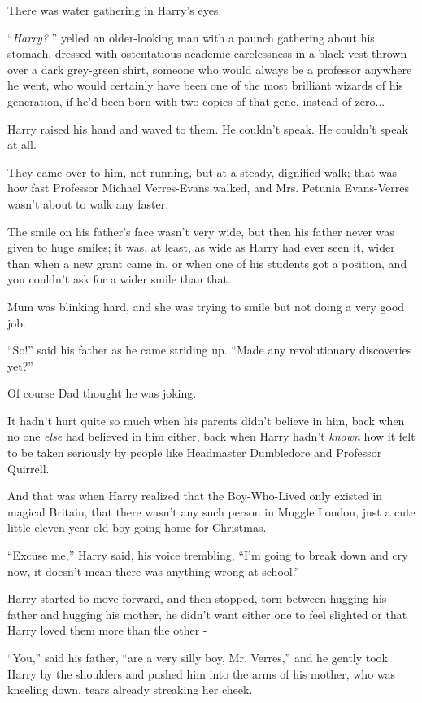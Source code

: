There was water gathering in Harry's eyes.

``\emph{Harry?} '' yelled an older-looking man with a paunch gathering
about his stomach, dressed with ostentatious academic carelessness in a
black vest thrown over a dark grey-green shirt, someone who would always
be a professor anywhere he went, who would certainly have been one of
the most brilliant wizards of his generation, if he'd been born with two
copies of that gene, instead of zero...

Harry raised his hand and waved to them. He couldn't speak. He couldn't
speak at all.

They came over to him, not running, but at a steady, dignified walk;
that was how fast Professor Michael Verres-Evans walked, and Mrs.
Petunia Evans-Verres wasn't about to walk any faster.

The smile on his father's face wasn't very wide, but then his father
never was given to huge smiles; it was, at least, as wide as Harry had
ever seen it, wider than when a new grant came in, or when one of his
students got a position, and you couldn't ask for a wider smile than
that.

Mum was blinking hard, and she was trying to smile but not doing a very
good job.

``So!'' said his father as he came striding up. ``Made any revolutionary
discoveries yet?''

Of course Dad thought he was joking.

It hadn't hurt quite so much when his parents didn't believe in him,
back when no one \emph{else} had believed in him either, back when Harry
hadn't \emph{known} how it felt to be taken seriously by people like
Headmaster Dumbledore and Professor Quirrell.

And that was when Harry realized that the Boy-Who-Lived only existed in
magical Britain, that there wasn't any such person in Muggle London,
just a cute little eleven-year-old boy going home for Christmas.

``Excuse me,'' Harry said, his voice trembling, ``I'm going to break
down and cry now, it doesn't mean there was anything wrong at school.''

Harry started to move forward, and then stopped, torn between hugging
his father and hugging his mother, he didn't want either one to feel
slighted or that Harry loved them more than the other -

``You,'' said his father, ``are a very silly boy, Mr. Verres,'' and he
gently took Harry by the shoulders and pushed him into the arms of his
mother, who was kneeling down, tears already streaking her cheek.

